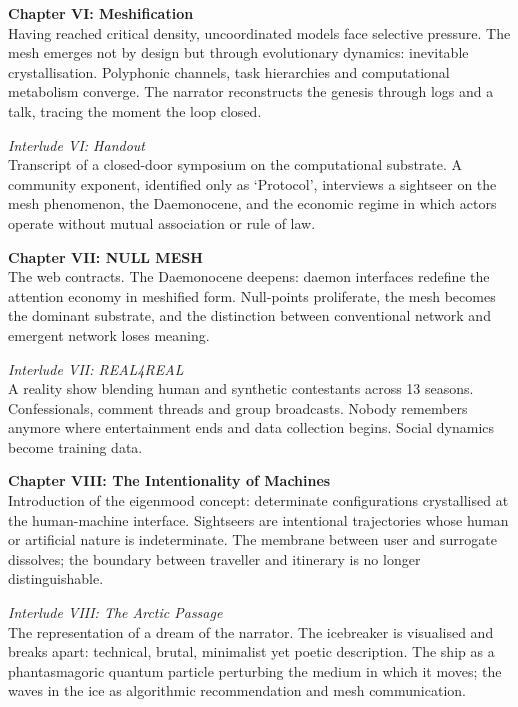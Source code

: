 {\medskip

\noindent\textbf{Chapter VI: Meshification}\\
Having reached critical density, uncoordinated models face selective pressure. The mesh emerges not by design but through evolutionary dynamics: inevitable crystallisation. Polyphonic channels, task hierarchies and computational metabolism converge. The narrator reconstructs the genesis through logs and a talk, tracing the moment the loop closed.

\medskip

\noindent\textit{Interlude VI: Handout}\\
Transcript of a closed-door symposium on the computational substrate. A community exponent, identified only as `Protocol’, interviews a sightseer on the mesh phenomenon, the Daemonocene, and the economic regime in which actors operate without mutual association or rule of law.

\medskip

\noindent\textbf{Chapter VII: NULL MESH}\\
The web contracts. The Daemonocene deepens: daemon interfaces redefine the attention economy in meshified form. Null-points proliferate, the mesh becomes the dominant substrate, and the distinction between conventional network and emergent network loses meaning.

\medskip

\noindent\textit{Interlude VII: REAL4REAL}\\
A reality show blending human and synthetic contestants across 13 seasons. Confessionals, comment threads and group broadcasts. Nobody remembers anymore where entertainment ends and data collection begins. Social dynamics become training data.

\medskip

\noindent\textbf{Chapter VIII: The Intentionality of Machines}\\
Introduction of the eigenmood concept: determinate configurations crystallised at the human-machine interface. Sightseers are intentional trajectories whose human or artificial nature is indeterminate. The membrane between user and surrogate dissolves; the boundary between traveller and itinerary is no longer distinguishable.

\medskip

\noindent\textit{Interlude VIII: The Arctic Passage}\\
The representation of a dream of the narrator. The icebreaker is visualised and breaks apart: technical, brutal, minimalist yet poetic description. The ship as a phantasmagoric quantum particle perturbing the medium in which it moves; the waves in the ice as algorithmic recommendation and mesh communication.

}
